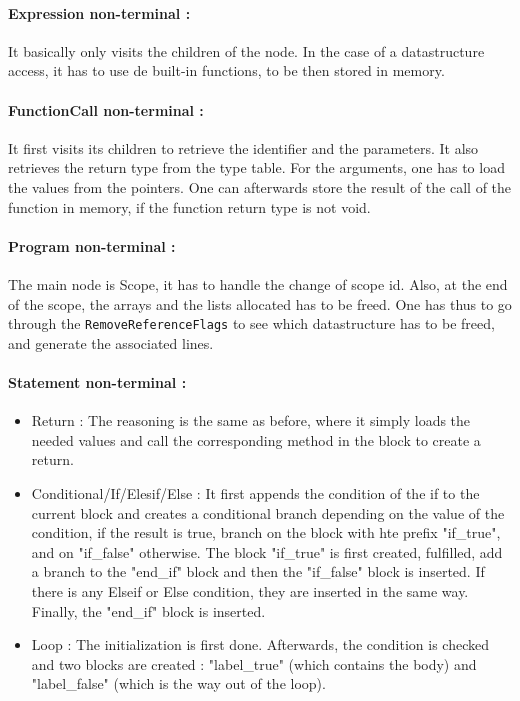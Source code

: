 \documentclass[a4paper,11pt]{article}
\begin{document}
\paragraph{Expression non-terminal :} It basically only visits the children of the node. In the case of a datastructure access, it has to use de built-in functions, to be then stored in memory.

\paragraph{FunctionCall non-terminal :} It first visits its children to retrieve the identifier and the parameters. It also retrieves the return type from the type table. For the arguments, one has to load the values from the pointers. One can afterwards store the result of the call of the function in memory, if the function return type is not void.

\paragraph{Program non-terminal :} The main node is Scope, it has to handle the change of scope id. Also, at the end of the scope, the arrays and the lists allocated has to be freed. One has thus to go through the \texttt{RemoveReferenceFlags} to see which datastructure has to be freed, and generate the associated lines.

\paragraph{Statement non-terminal :} 

\begin{itemize}
	\item Return : The reasoning is the same as before, where it simply loads the needed values and call the corresponding method in the block to create a return.
	\item Conditional/If/Elesif/Else : It first appends the condition of the if to the current block and creates a conditional branch depending on the value of the condition, if the result is true, branch on the block with hte prefix "if\_true", and on "if\_false" otherwise. The block "if\_true" is first created, fulfilled, add a branch to the "end\_if" block and then the "if\_false" block is inserted. If there is any Elseif or Else condition, they are inserted in the same way. Finally, the "end\_if" block is inserted.
	\item Loop : The initialization is first done. Afterwards, the condition is checked and two blocks are created : "label\_true" (which contains the body) and "label\_false" (which is the way out of the loop). 
\end{itemize}
\end{document}
